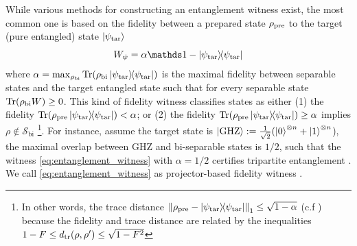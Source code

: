 \documentclass[
aps,
pra,
twocolumn,
floatfix,
]{revtex4-2}
\theoremstyle{plain}
\theoremstyle{definition}
\newtheorem{remark}{Remark}
\newcommand{\ew}{W}
\newcommand{\ob}{O}
\newcommand{\dm}{\rho}
\newcommand{\ghz}{\text{GHZ}}
\newcommand{\bi}{\text{bi}}
\newcommand{\target}{\textup{tar}}
\newcommand{\prepare}{\textup{pre}}
\newcommand{\separableset}{\mathcal{S}}
\begin{document}
While various methods for constructing an entanglement witness exist, the most common one is based on the fidelity between a prepared state $\dm_{\prepare}$ to the target (pure entangled) state $\ket{\psi_{\target}}$
\begin{equation}
	\ew_{\psi} = \alpha\identity - \op{\psi_\target} 
	\label{eq:entanglement_witness}
\end{equation}
where $\alpha = \max_{\dm_{\bi}} \Tr(\dm_{\bi}\op{\psi_{\target}})$ is the maximal fidelity between separable states and the target entangled state such that for every separable state $\Tr(\dm_{\bi}\ew)\ge 0$.
This kind of fidelity witness classifies states as either
(1) the fidelity $ \Tr(\dm_{\prepare}\op{\psi_{\target}}) < \alpha$; or
(2) the fidelity $ \Tr(\dm_{\prepare}\op{\psi_{\target}}) \ge \alpha$ implies $\dm\notin\separableset_{\bi}$
\footnote{In other words, the trace distance $\norm{\dm_{\prepare}-\op{\psi_\target}}_1 \le \sqrt{1-\alpha}$ (c.f ) because the fidelity and trace distance are related by the inequalities
$1-F\le d_{\tr}(\dm,\dm') \le \sqrt{1-F^2}$}.
For instance, assume the target state is $\ket{\ghz}:=\frac{1}{\sqrt{2}}(\ket{0}^{\otimes n} + \ket{1}^{\otimes n}$),
the maximal overlap between GHZ and bi-separable states is $1/2$,
such that the witness \cref{eq:entanglement_witness} with $\alpha=1/2$ certifies tripartite entanglement
\cite{acinClassificationMixedThreequbit2001}.
We call \cref{eq:entanglement_witness} as projector-based fidelity witness \cite{bourennaneWitnessingMultipartiteEntanglement2004}.
\end{document}
